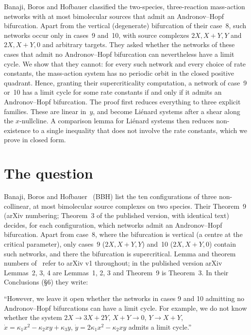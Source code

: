 \documentclass[11pt,a4paper]{report}
\begin{document}
\makepapertitle

\begin{paperabstract}
Banaji, Boros and Hofbauer classified the two-species, three-reaction mass-action networks with at most bimolecular
sources that admit an Andronov--Hopf bifurcation. Apart from the vertical (degenerate) bifurcation of their case~8,
such networks occur only in cases~9 and~10, with source complexes \(2X, X+Y, Y\) and \(2X, X+Y, 0\) and arbitrary
targets. They asked whether the networks of these cases that
admit no Andronov--Hopf bifurcation can nevertheless have a limit cycle. We show that they cannot: for every such
network and every choice of rate constants, the mass-action system has no periodic orbit in the closed positive
quadrant. Hence, granting their supercriticality computation, a network of case~9 or~10 has a limit cycle for some
rate constants if and only if it admits an Andronov--Hopf bifurcation. The proof first reduces everything to three
explicit families. These are linear in~\(y\), and become Li\'enard systems after a shear along the \(x\)-nullcline. A
comparison lemma for Li\'enard systems then reduces non-existence to a single inequality that does not involve the
rate constants, which we prove in closed form.
\end{paperabstract}

\section*{The question}

Banaji, Boros and Hofbauer~\autocite{BBH2024} (BBH) list the ten configurations of three non-collinear, at most
bimolecular source complexes on two species. Their Theorem~9 (arXiv numbering; Theorem~3 of the published version,
with identical text) decides, for each configuration, which networks admit an Andronov--Hopf bifurcation. Apart from case~8, where the
bifurcation is vertical (a centre at the critical parameter), only cases~9 (\(2X, X+Y, Y\)) and~10 (\(2X, X+Y, 0\))
contain such networks, and there the bifurcation is supercritical. Lemma and theorem numbers of~\autocite{BBH2024}
refer to arXiv v1 throughout; in the published version arXiv Lemmas~2, 3, 4 are Lemmas~1, 2, 3 and Theorem~9 is
Theorem~3. In their Conclusions (§6) they write:

\begin{openquote}
``However, we leave it open whether the networks in cases 9 and 10 admitting no Andronov--Hopf bifurcations can have
a limit cycle. For example, we do not know whether the system \(2X\to3X+2Y\), \(X+Y\to0\), \(Y\to X+Y\),
\(\dot x=\kappa_1x^2-\kappa_2xy+\kappa_3y\), \(\dot y=2\kappa_1x^2-\kappa_2xy\) admits a limit cycle.''
\end{openquote}
\end{document}
